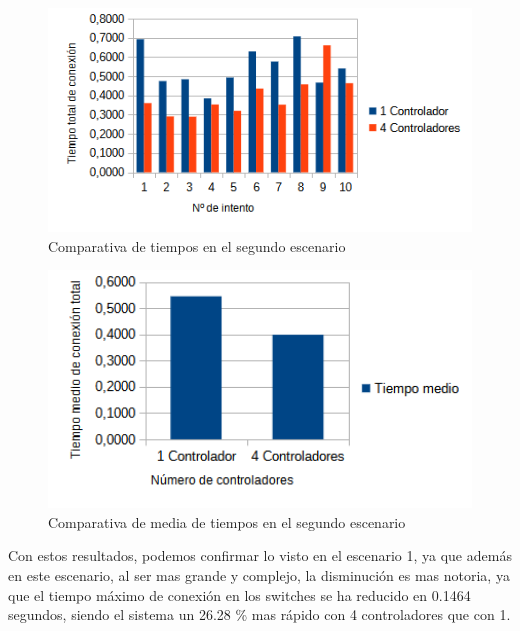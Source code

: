 \documentclass[a4paper, 12pt]{book}
\begin{document}
 	\begin{figure}[H]
 		\centering
 		\includegraphics[width=16cm, keepaspectratio]{img/comparativamesh}
 		\caption{Comparativa de tiempos en el segundo escenario}
 		\label{figura:comparativamesh}
 	\end{figure}
 	
 	\begin{figure}[H]
 		\centering
 		\includegraphics[width=16cm, keepaspectratio]{img/comparativamediamesh}
 		\caption{Comparativa de media de tiempos en el segundo escenario}
 		\label{figura:mediamesh}
 	\end{figure}
 	
	Con estos resultados, podemos confirmar lo visto en el escenario 1, ya que además en este escenario, al ser mas grande y complejo, la disminución es mas notoria, ya que el tiempo máximo de conexión en los switches se ha reducido en 0.1464 segundos, siendo el sistema un 26.28 \% mas rápido con 4 controladores que con 1.
	
	
\end{document}

